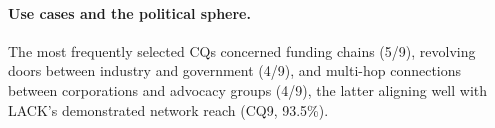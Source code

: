 %
%
%
\vspace{-0.2cm}\paragraph{Use cases and the political sphere.} The most frequently selected CQs concerned funding chains (5/9), revolving doors between industry and government (4/9), and multi-hop connections between corporations and advocacy groups (4/9), the latter aligning well with LACK's demonstrated network reach (CQ9, 93.5\%).
